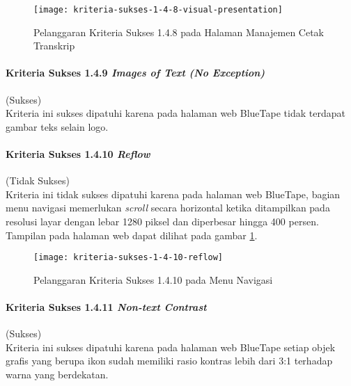 \begin{figure}[H]
    \centering  
    \texttt{[image: kriteria-sukses-1-4-8-visual-presentation]}  
    \caption[Pelanggaran Kriteria Sukses 1.4.8 pada Halaman Manajemen Cetak Transkrip]{Pelanggaran Kriteria Sukses 1.4.8 pada Halaman Manajemen Cetak Transkrip}
    \label{fig:1.4.8_visual_presentation}  
\end{figure} 

\paragraph{Kriteria Sukses 1.4.9 \textit{Images of Text (No Exception)}}
\label{par:kepatuhan_bluetape_kriteria_sukses_1.4.9}
(Sukses)\\

Kriteria ini sukses dipatuhi karena pada halaman web BlueTape tidak terdapat gambar teks selain logo.

\paragraph{Kriteria Sukses 1.4.10 \textit{Reflow}}
\label{par:kepatuhan_bluetape_kriteria_sukses_1.4.10}
(Tidak Sukses)\\

Kriteria ini tidak sukses dipatuhi karena pada halaman web BlueTape, bagian menu navigasi memerlukan \textit{scroll} secara horizontal ketika ditampilkan pada resolusi layar dengan lebar 1280 piksel dan diperbesar hingga 400 persen. Tampilan pada halaman web dapat dilihat pada gambar \ref{fig:1.4.8_visual_presentation}.

\begin{figure}[H]
    \centering  
    \texttt{[image: kriteria-sukses-1-4-10-reflow]}  
    \caption[Pelanggaran Kriteria Sukses 1.4.10 pada Menu Navigasi]{Pelanggaran Kriteria Sukses 1.4.10 pada Menu Navigasi}
    \label{fig:1.4.10_reflow}  
\end{figure} 

\paragraph{Kriteria Sukses 1.4.11 \textit{Non-text Contrast}}
\label{par:kepatuhan_bluetape_kriteria_sukses_1.4.11}
(Sukses)\\

Kriteria ini sukses dipatuhi karena pada halaman web BlueTape setiap objek grafis yang berupa ikon sudah memiliki rasio kontras lebih dari 3:1 terhadap warna yang berdekatan.

